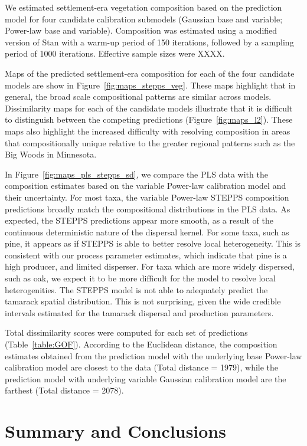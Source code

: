 \documentclass[12pt]{article}
\begin{document}
We estimated settlement-era vegetation composition based on the
prediction model for four candidate calibration submodels (Gaussian
base and variable; Power-law base and variable). Composition was
estimated using a modified version of Stan with a warm-up period of
150 iterations, followed by a sampling period of 1000
iterations. Effective sample sizes were XXXX.

Maps of the predicted settlement-era composition for each of the four
candidate models are show in Figure~\ref{fig:maps_stepps_veg}. These
maps highlight that in general, the broad scale compositional patterns
are similar across models. Dissimilarity maps for each of the
candidate models illustrate that it is difficult to distinguish
between the competing predictions (Figure~\ref{fig:maps_l2}). These
maps also highlight the increased difficulty with resolving
composition in areas that compositionally unique relative to the
greater regional patterns such as the Big Woods in Minnesota.

In Figure~\ref{fig:maps_pls_stepps_sd}, we compare the PLS data with
the composition estimates based on the variable Power-law calibration
model and their uncertainty. For most taxa, the variable Power-law
STEPPS composition predictions broadly match the compositional
distributions in the PLS data. As expected, the STEPPS predictions
appear more smooth, as a result of the continuous deterministic nature
of the dispersal kernel. For some taxa, such as pine, it appears as if
STEPPS is able to better resolve local heterogeneity. This is
consistent with our process parameter estimates, which indicate that
pine is a high producer, and limited disperser. For taxa which are
more widely dispersed, such as oak, we expect it to be more difficult
for the model to resolve local heterogenities. The STEPPS model is not
able to adequately predict the tamarack spatial distribution. This is
not surprising, given the wide credible intervals estimated for the
tamarack dispersal and production parameters.

Total dissimilarity scores were computed for each set of predictions
(Table~\ref{table:GOF}). According to the Euclidean distance, the
composition estimates obtained from the prediction model with the
underlying base Power-law calibration model are closest to the data
(Total distance = 1979), while the prediction model with underlying
variable Gaussian calibration model are the farthest (Total distance =
2078).

\section{Summary and Conclusions}
\end{document}
